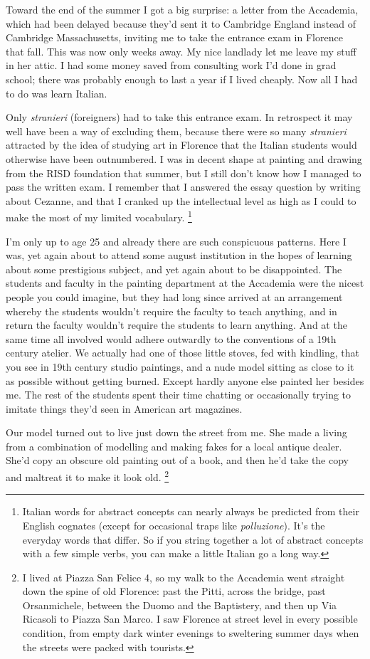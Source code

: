 \documentclass[12pt]{book}
\begin{document}
Toward the end of the summer I got a big surprise: a letter from the
Accademia, which had been delayed because they'd sent it to Cambridge
England instead of Cambridge Massachusetts, inviting me to take the
entrance exam in Florence that fall. This was now only weeks away. My
nice landlady let me leave my stuff in her attic. I had some money saved
from consulting work I'd done in grad school; there was probably enough
to last a year if I lived cheaply. Now all I had to do was learn
Italian.

Only \emph{stranieri} (foreigners) had to take this entrance exam. In
retrospect it may well have been a way of excluding them, because there
were so many \emph{stranieri} attracted by the idea of studying art in
Florence that the Italian students would otherwise have been
outnumbered. I was in decent shape at painting and drawing from the RISD
foundation that summer, but I still don't know how I managed to pass the
written exam. I remember that I answered the essay question by writing
about Cezanne, and that I cranked up the intellectual level as high as I
could to make the most of my limited vocabulary. \footnote{Italian words for abstract concepts can nearly always be
predicted from their English cognates (except for occasional traps like
\emph{polluzione}). It's the everyday words that differ. So if you
string together a lot of abstract concepts with a few simple verbs, you
can make a little Italian go a long way.}

I'm only up to age 25 and already there are such conspicuous patterns.
Here I was, yet again about to attend some august institution in the
hopes of learning about some prestigious subject, and yet again about to
be disappointed. The students and faculty in the painting department at
the Accademia were the nicest people you could imagine, but they had
long since arrived at an arrangement whereby the students wouldn't
require the faculty to teach anything, and in return the faculty
wouldn't require the students to learn anything. And at the same time
all involved would adhere outwardly to the conventions of a 19th century
atelier. We actually had one of those little stoves, fed with kindling,
that you see in 19th century studio paintings, and a nude model sitting
as close to it as possible without getting burned. Except hardly anyone
else painted her besides me. The rest of the students spent their time
chatting or occasionally trying to imitate things they'd seen in
American art magazines.

Our model turned out to live just down the street from me. She made a
living from a combination of modelling and making fakes for a local
antique dealer. She'd copy an obscure old painting out of a book, and
then he'd take the copy and maltreat it to make it look old.
\footnote{I lived at Piazza San Felice 4, so my walk to the Accademia went
straight down the spine of old Florence: past the Pitti, across the
bridge, past Orsanmichele, between the Duomo and the Baptistery, and
then up Via Ricasoli to Piazza San Marco. I saw Florence at street level
in every possible condition, from empty dark winter evenings to
sweltering summer days when the streets were packed with tourists.}
\end{document}

